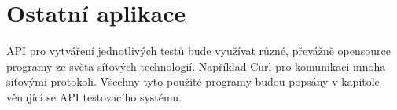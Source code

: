 \section{Ostatní aplikace}
API pro vytváření jednotlivých testů bude využívat různé, převážně opensource programy ze světa síťových technologií. Například Curl pro komunikaci mnoha síťovými protokoli. Všechny tyto použité programy budou popsány v kapitole věnující se API testovacího systému.

\endinput
